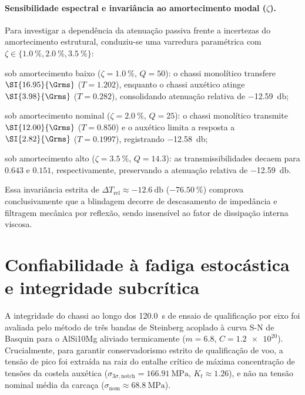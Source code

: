 \paragraph*{Sensibilidade espectral e invariância ao amortecimento modal ($\zeta$).}
Para investigar a dependência da atenuação passiva frente a incertezas do amortecimento estrutural, conduziu-se uma varredura paramétrica com $\zeta \in \{\SI{1.0}{\percent}, \SI{2.0}{\percent}, \SI{3.5}{\percent}\}$:
\begin{alineas}
  \item sob amortecimento baixo ($\zeta = \SI{1.0}{\percent}$, $Q = 50$): o chassi monolítico transfere $\SI{16.95}{\Grms}$ ($T = \num{1.202}$), enquanto o chassi auxético atinge $\SI{3.98}{\Grms}$ ($T = \num{0.282}$), consolidando atenuação relativa de \SI{-12.59}{\decibel};
  \item sob amortecimento nominal ($\zeta = \SI{2.0}{\percent}$, $Q = 25$): o chassi monolítico transmite $\SI{12.00}{\Grms}$ ($T = \num{0.850}$) e o auxético limita a resposta a $\SI{2.82}{\Grms}$ ($T = \num{0.1997}$), registrando \SI{-12.58}{\decibel};
  \item sob amortecimento alto ($\zeta = \SI{3.5}{\percent}$, $Q = 14.3$): as transmissibilidades decaem para $\num{0.643}$ e $\num{0.151}$, respectivamente, preservando a atenuação relativa de \SI{-12.59}{\decibel}.
\end{alineas}
Essa invariância estrita de $\Delta T_{\text{rel}} \approx \SI{-12.6}{\decibel}$ ($\SI{-76.50}{\percent}$) comprova conclusivamente que a blindagem decorre de descasamento de impedância e filtragem mecânica por reflexão, sendo insensível ao fator de dissipação interna viscosa.

\section{Confiabilidade à fadiga estocástica e integridade subcrítica}
\label{sec:res-fadiga}

A integridade do chassi ao longo dos \SI{120.0}{\second} de ensaio de qualificação por eixo foi avaliada pelo método de três bandas de Steinberg acoplado à curva S-N de Basquin para o AlSi10Mg aliviado termicamente ($m = \num{6.8}$, $C = \num{1.2e20}$). Crucialmente, para garantir conservadorismo estrito de qualificação de voo, a tensão de pico foi extraída na raiz do entalhe crítico de máxima concentração de tensões da costela auxética ($\sigma_{3\sigma,\text{notch}} = \SI{166.91}{\mega\pascal}$, $K_t \approx \num{1.26}$), e não na tensão nominal média da carcaça ($\sigma_{\text{nom}} \approx \SI{68.8}{\mega\pascal}$).


